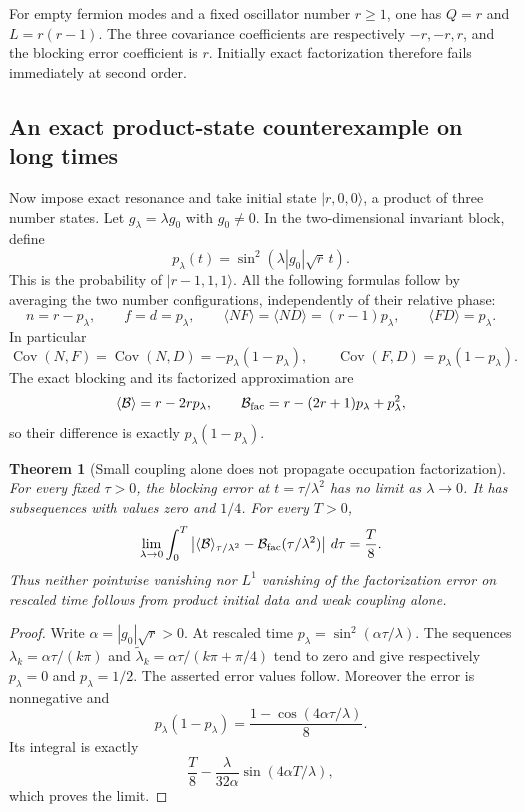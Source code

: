 \documentclass[11pt]{article}
\newtheorem{theorem}{Theorem}[section]
\theoremstyle{remark}
\begin{document}
For empty fermion modes and a fixed oscillator number \(r\geq1\),
one has \(Q=r\) and \(L=r(r-1)\).  The three covariance
coefficients are respectively \(-r,-r,r\), and the blocking
error coefficient is \(r\).  Initially exact factorization
therefore fails immediately at second order.

\subsection{An exact product-state counterexample on long times}

Now impose exact resonance and take initial state
\(|r,0,0\rangle\), a product of three number states.
Let \(g_\lambda=\lambda g_0\) with \(g_0\ne0\).
In the two-dimensional invariant block, define
\[
 p_\lambda(t)=\sin^2(\lambda|g_0|\sqrt r\,t).
\]
This is the probability of \(|r-1,1,1\rangle\).
All the following formulas follow by averaging the two
number configurations, independently of their relative phase:
\[
 n=r-p_\lambda,\qquad f=d=p_\lambda,\qquad
 \langle NF\rangle=\langle ND\rangle=(r-1)p_\lambda,\qquad
 \langle FD\rangle=p_\lambda .
\]
In particular
\[
 \operatorname{Cov}(N,F)=\operatorname{Cov}(N,D)
      =-p_\lambda(1-p_\lambda),\qquad
 \operatorname{Cov}(F,D)=p_\lambda(1-p_\lambda).
\]
The exact blocking and its factorized approximation are
\[
 \langle\mathcal B\rangle=r-2rp_\lambda,\qquad
 \mathcal B_{\rm fac}
     =r-(2r+1)p_\lambda+p_\lambda^2,
\]
so their difference is exactly \(p_\lambda(1-p_\lambda)\).

\begin{theorem}[Small coupling alone does not propagate occupation factorization]
\label{thm:v20v54-obstruction}
For every fixed \(\tau>0\), the blocking error at
\(t=\tau/\lambda^2\) has no limit as \(\lambda\to0\).
It has subsequences with values zero and \(1/4\).
For every \(T>0\),
\[
 \lim_{\lambda\to0}\int_0^T
 \left|\langle\mathcal B\rangle_{\tau/\lambda^2}
             -\mathcal B_{\rm fac}(\tau/\lambda^2)\right|\,d\tau
 =\frac{T}{8}.
\]
Thus neither pointwise vanishing nor \(L^1\) vanishing of the
factorization error on rescaled time follows from product
initial data and weak coupling alone.
\end{theorem}
\begin{proof}
Write \(\alpha=|g_0|\sqrt r>0\).  At rescaled time
\(p_\lambda=\sin^2(\alpha\tau/\lambda)\).
The sequences
\(\lambda_k=\alpha\tau/(k\pi)\) and
\(\widetilde\lambda_k=\alpha\tau/(k\pi+\pi/4)\)
tend to zero and give respectively \(p_\lambda=0\) and
\(p_\lambda=1/2\).  The asserted error values follow.
Moreover the error is nonnegative and
\[
 p_\lambda(1-p_\lambda)
       =\frac{1-\cos(4\alpha\tau/\lambda)}8.
\]
Its integral is exactly
\[
 \frac{T}{8}
 -\frac{\lambda}{32\alpha}\sin(4\alpha T/\lambda),
\]
which proves the limit.
\end{proof}
\end{document}
